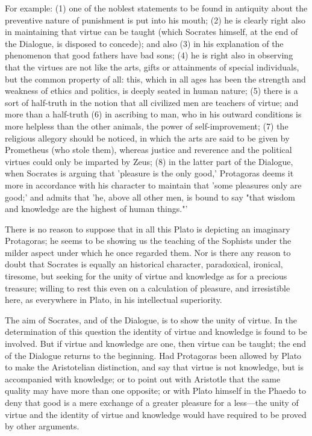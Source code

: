 \documentclass[11pt,letter]{article}
\begin{document}
\par  For example: (1) one of the noblest statements to be found in antiquity about the preventive nature of punishment is put into his mouth; (2) he is clearly right also in maintaining that virtue can be taught (which Socrates himself, at the end of the Dialogue, is disposed to concede); and also (3) in his explanation of the phenomenon that good fathers have bad sons; (4) he is right also in observing that the virtues are not like the arts, gifts or attainments of special individuals, but the common property of all: this, which in all ages has been the strength and weakness of ethics and politics, is deeply seated in human nature; (5) there is a sort of half-truth in the notion that all civilized men are teachers of virtue; and more than a half-truth (6) in ascribing to man, who in his outward conditions is more helpless than the other animals, the power of self-improvement; (7) the religious allegory should be noticed, in which the arts are said to be given by Prometheus (who stole them), whereas justice and reverence and the political virtues could only be imparted by Zeus; (8) in the latter part of the Dialogue, when Socrates is arguing that 'pleasure is the only good,' Protagoras deems it more in accordance with his character to maintain that 'some pleasures only are good;' and admits that 'he, above all other men, is bound to say "that wisdom and knowledge are the highest of human things."'

\par  There is no reason to suppose that in all this Plato is depicting an imaginary Protagoras; he seems to be showing us the teaching of the Sophists under the milder aspect under which he once regarded them. Nor is there any reason to doubt that Socrates is equally an historical character, paradoxical, ironical, tiresome, but seeking for the unity of virtue and knowledge as for a precious treasure; willing to rest this even on a calculation of pleasure, and irresistible here, as everywhere in Plato, in his intellectual superiority.

\par  The aim of Socrates, and of the Dialogue, is to show the unity of virtue. In the determination of this question the identity of virtue and knowledge is found to be involved. But if virtue and knowledge are one, then virtue can be taught; the end of the Dialogue returns to the beginning. Had Protagoras been allowed by Plato to make the Aristotelian distinction, and say that virtue is not knowledge, but is accompanied with knowledge; or to point out with Aristotle that the same quality may have more than one opposite; or with Plato himself in the Phaedo to deny that good is a mere exchange of a greater pleasure for a less—the unity of virtue and the identity of virtue and knowledge would have required to be proved by other arguments.
\end{document}
